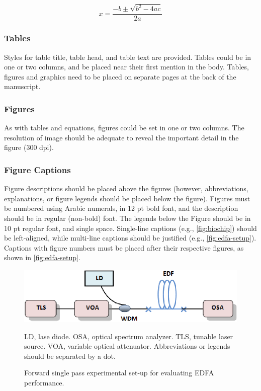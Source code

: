 \documentclass{siintec}
\begin{document}
\begin{equation}
x = \frac{-b \pm \sqrt{b^2 - 4ac}}{2a}
\end{equation}

\subsubsection{Tables}
Styles for table title, table head, and table text are provided. Tables could be in one or two columns, and be placed near their first mention in the body. Tables, figures and graphics need to be placed on separate pages at the back of the manuscript.

\subsubsection{Figures}
As with tables and equations, figures could be set in one or two columns. The resolution of image should be adequate to reveal the important detail in the figure (300 dpi).

\subsubsection{Figure Captions}
Figure descriptions should be placed above the figures (however, abbreviations, explanations, or figure legends should be placed below the figure). Figures must be numbered using Arabic numerals, in 12 pt bold font, and the description should be in regular (non-bold) font. The legends below the Figure should be in 10 pt regular font, and single space. Single-line captions (e.g., \autoref{fig:biochip}) should be left-aligned, while multi-line captions should be justified (e.g., \autoref{fig:edfa-setup}). Captions with figure numbers must be placed after their respective figures, as shown in \autoref{fig:edfa-setup}.

\begin{figure}[ht]
    \centering
    \caption{Forward single pass experimental set-up for evaluating EDFA performance.}
    \label{fig:edfa-setup}
        \vspace{0.5em}
    \includegraphics[width=0.7\linewidth]{edfa-setup.png}
    \begin{flushleft}
    \fontsize{10}{12}\selectfont
    LD, lase diode. OSA, optical spectrum analyzer. TLS, tunable laser source. VOA, variable optical attenuator. Abbreviations or legends should be separated by a dot.
    \end{flushleft}
\end{figure}
\end{document}
